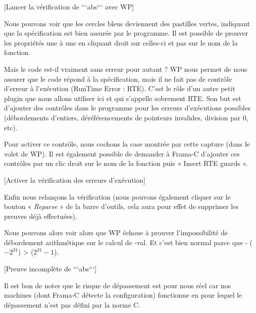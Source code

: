 [Lancer la vérification de ```abs``` avec WP]


Nous pouvons voir que les cercles bleus deviennent des pastilles vertes, 
indiquant que la spécification est bien assurée par le programme. Il est 
possible de prouver les propriétés une à une en cliquant droit sur celles-ci 
et pas sur le nom de la fonction.



Mais le code est-il vraiment sans erreur pour autant ? WP nous permet de nous 
assurer que le code répond à la spécification, mais il ne fait pas de contrôle 
d'erreur à l'exécution (RunTime Error : RTE). C'est le rôle d'un autre petit 
plugin que nous allons utiliser ici et qui s'appelle sobrement RTE. Son but est
d'ajouter des contrôles dans le programme pour les erreurs d'exécutions 
possibles (débordements d'entiers, déréférencements de pointeurs invalides, 
division par 0, etc).



Pour activer ce contrôle, nous cochons la case montrée par cette capture (dans 
le volet de WP). Il est également possible de demander à Frama-C d'ajouter ces 
contrôles par un clic droit sur le nom de la fonction puis « Insert RTE guards ».



[Activer la vérification des erreurs d'exécution]


Enfin nous relançons la vérification (nous pouvons également cliquer sur le 
bouton « \textit{Reparse} » de la barre d'outils, cela aura pour effet de supprimer les
preuves déjà effectuées).



Nous pouvons alors voir alors que WP échoue à prouver  l'impossibilité de 
débordement arithmétique sur le calcul de -val. Et c'est bien normal parce 
que - ($-2^{31}$) >  ($2^{31}-1$).



[Preuve incomplète de ```abs```]


\begin{Information}
Il est bon de noter que le risque de dépassement est pour nous réel car nos
machines (dont Frama-C détecte la configuration) fonctionne en 
pour lequel le dépassement n'est pas défini par la norme C.
\end{Information}


